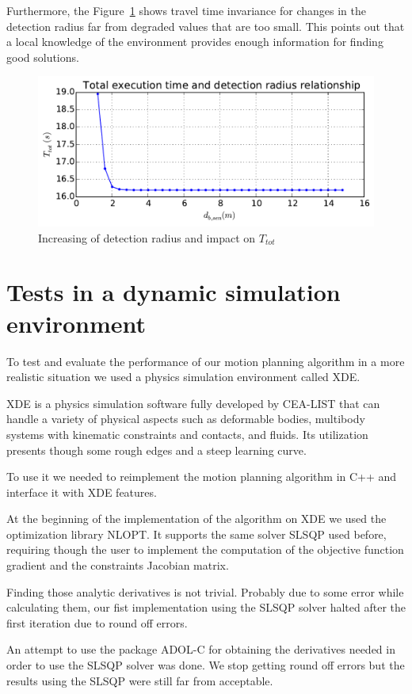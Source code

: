 Furthermore, the Figure~\ref{fig:drhotot} shows travel time
invariance for changes in the detection radius far from degraded values that are too small.
This points out that a local knowledge of the environment provides enough information for finding good solutions.
\begin{figure}[H]\centering
  \includegraphics[width=.65\linewidth]{./images/drho/drho-tot.pdf}
  \caption{Increasing of detection radius and impact on
  $T_{tot}$\label{fig:drhotot}}
\end{figure}



\section{Tests in a dynamic simulation environment}

To test and evaluate the performance of our motion planning algorithm in a more realistic situation we used a physics simulation environment called XDE. 

XDE is a physics simulation software fully developed by CEA-LIST that can handle a variety of physical aspects such as deformable bodies, multibody systems with kinematic constraints and contacts, and fluids. Its utilization presents though some rough edges and a steep learning curve.

To use it we needed to reimplement the motion planning algorithm in C++ and interface it with XDE features.

At the beginning of the implementation of the algorithm on XDE we used the optimization library NLOPT. It supports the same solver SLSQP used before, requiring though the user to implement the computation of the objective function gradient and the constraints Jacobian matrix.

Finding those analytic derivatives is not trivial. Probably due to some error while calculating them, our fist implementation using the SLSQP solver halted after the first iteration due to round off errors.

An attempt to use the package ADOL-C for obtaining the derivatives needed  in order to use the SLSQP solver was done. We stop getting round off errors but the results using the SLSQP were still far from acceptable.

